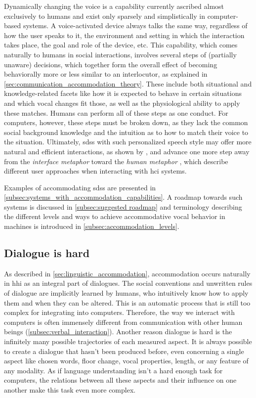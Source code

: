Dynamically changing the voice is a capability currently ascribed almost exclusively to humans and exist only sparsely and simplistically in computer-based systems.
A voice-activated device always talks the same way, regardless of how the user speaks to it, the environment and setting in which the interaction takes place, the goal and role of the device, etc.
This capability, which comes naturally to humans in social interactions, involves several steps of (partially unaware) decisions, which together form the overall effect of becoming behaviorally more or less similar to an interlocutor, as explained in \cref{sec:communication_accommodation_theory}.
These include both situational and knowledge-related facets like how it is expected to behave in certain situations and which vocal changes fit those, as well as the physiological ability to apply these matches.
Humans can perform all of these steps as one conduct.
For computers, however, these steps must be broken down, as they lack the common social background knowledge and the intuition as to how to match their voice to the situation.
Ultimately, \Acp{sds} with such personalized speech style may offer more natural and efficient interactions, as shown by \citet{Porzel2006entrainment}, and advance one more step away from the \emph{interface metaphor} \citep{Edlund2006twofaces} toward the \emph{human metaphor} \citep{Carlson2006humanlike}, which describe different user approaches when interacting with \ac{hci} systems.

Examples of accommodating \acp{sds} are presented in \cref{subsec:systems_with_accommodation_capabilities}.
A roadmap towards such systems is discussed in \cref{subsec:suggested roadmap} and terminology describing the different levels and ways to achieve accommodative vocal behavior in machines is introduced in \cref{subsec:accommodation_levels}.

\subsection{Dialogue is hard}
\label{subsec:dialogue_is_hard}

As described in \cref{sec:linguistic_accommodation}, accommodation occurs naturally in \ac{hhi} as an integral part of dialogues.
The social conventions and unwritten rules of dialogue are implicitly learned by humans, who intuitively know how to apply them and when they can be altered.
This is an automatic process that is still too complex for integrating into computers.
Therefore, the way we interact with computers is often immensely different from communication with other human beings (\cref{subsec:verbal_interaction}).
Another reason dialogue is hard is the infinitely many possible trajectories of each measured aspect.
It is always possible to create a dialogue that hasn't been produced before, even concerning a single aspect like chosen words, floor change, vocal properties, length, or any feature of any modality.
As if language understanding isn't a hard enough task for computers, the relations between all these aspects and their influence on one another make this task even more complex.

